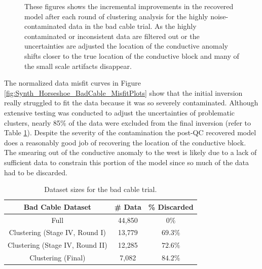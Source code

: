 \documentclass[final,authoryear,5p,times,twocolumn]{elsarticle}
\begin{document}
\begin{figure} [!ht]
\begin{center}
{       } %
    \end{center}
\caption{These figures shows the incremental improvements in the recovered model after each round of clustering analysis for the highly noise-contaminated data in the bad cable trial. As the highly contaminated or inconsistent data are filtered out or the uncertainties are adjusted the location of the conductive anomaly shifts closer to the true location of the conductive block and many of the small scale artifacts disappear.}
\label{fig:Synth_Horseshoe_BadCable}
\end{figure}

The normalized data misfit curves in Figure \ref{fig:Synth_Horseshoe_BadCable_MisfitPlots} show that the initial inversion really struggled to fit the data because it was so severely contaminated. Although extensive testing was conducted to adjust the uncertainties of problematic clusters, nearly 85\% of the data were excluded from the final inversion (refer to Table \ref{tab:Synth_BadCable_Sizes}). Despite the severity of the contamination the post-QC recovered model does a reasonably good job of recovering the location of the conductive block. The smearing out of the conductive anomaly to the west is likely due to a lack of sufficient data to constrain this portion of the model since so much of the data had to be discarded. 

\begin{table}[!ht]
\small
\begin{center}
  \begin{tabular}{| c | c | c |}
    \hline
    \bf{Bad Cable Dataset} & \bf{\# Data} & \bf{\% Discarded}\\
    \hline
    Full & 44,850 & $0 \%$\\
    \hline
    Clustering (Stage IV, Round I) &  13,779 & $69.3 \%$\\
    \hline
    Clustering (Stage IV, Round II) & 12,285 & $72.6 \%$\\
    \hline
    Clustering (Final) & 7,082 & $84.2 \%$\\
    \hline   
  \end{tabular}
\caption{Dataset sizes for the bad cable trial.}
\label{tab:Synth_BadCable_Sizes}
\end{center}
\end{table} 
\end{document}

